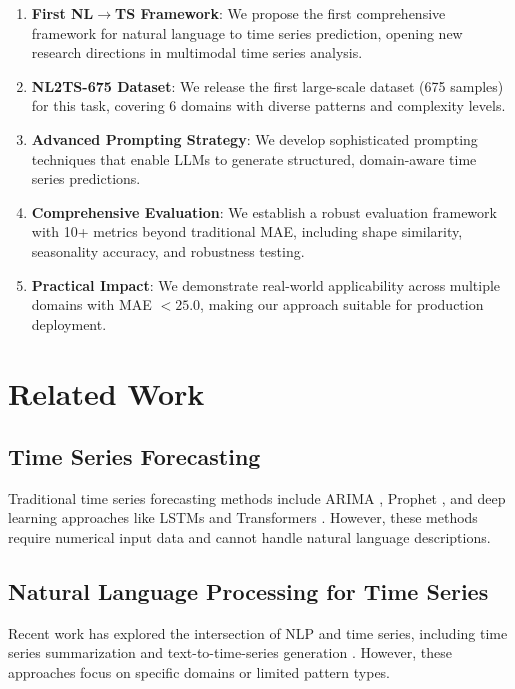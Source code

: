 \documentclass[11pt]{article}
\begin{document}
\begin{enumerate}
    \item \textbf{First NL$\rightarrow$TS Framework}: We propose the first comprehensive framework for natural language to time series prediction, opening new research directions in multimodal time series analysis.
    
    \item \textbf{NL2TS-675 Dataset}: We release the first large-scale dataset (675 samples) for this task, covering 6 domains with diverse patterns and complexity levels.
    
    \item \textbf{Advanced Prompting Strategy}: We develop sophisticated prompting techniques that enable LLMs to generate structured, domain-aware time series predictions.
    
    \item \textbf{Comprehensive Evaluation}: We establish a robust evaluation framework with 10+ metrics beyond traditional MAE, including shape similarity, seasonality accuracy, and robustness testing.
    
    \item \textbf{Practical Impact}: We demonstrate real-world applicability across multiple domains with MAE $< 25.0$, making our approach suitable for production deployment.
\end{enumerate}

\section{Related Work}

\subsection{Time Series Forecasting}
Traditional time series forecasting methods include ARIMA \cite{box1976time}, Prophet \cite{taylor2018forecasting}, and deep learning approaches like LSTMs \cite{hochreiter1997long} and Transformers \cite{vaswani2017attention}. However, these methods require numerical input data and cannot handle natural language descriptions.

\subsection{Natural Language Processing for Time Series}
Recent work has explored the intersection of NLP and time series, including time series summarization \cite{meng2021time} and text-to-time-series generation \cite{zhang2022text}. However, these approaches focus on specific domains or limited pattern types.
\end{document}
